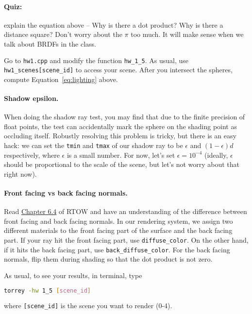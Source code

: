 \paragraph{Quiz:} explain the equation above -- Why is there a dot product? Why is there a distance square? Don't worry about the $\pi$ too much. It will make sense when we talk about BRDFs in the class.

Go to \lstinline{hw1.cpp} and modify the function \lstinline{hw_1_5}. As usual, use \lstinline{hw1_scenes[scene_id]} to access your scene. After you intersect the spheres, compute Equation~\eqref{eq:lighting} above.

\paragraph{Shadow epsilon.} When doing the shadow ray test, you may find that due to the finite precision of float points, the test can accidentally mark the sphere on the shading point as occluding itself. Robustly resolving this problem is tricky, but there is an easy hack: we can set the \lstinline{tmin} and \lstinline{tmax} of our shadow ray to be $\epsilon$ and $\left(1 - \epsilon\right) d$ respectively, where $\epsilon$ is a small number. For now, let's set $\epsilon = 10^{-4}$ (ideally, $\epsilon$ should be proportional to the scale of the scene, but let's not worry about that right now).

\paragraph{Front facing vs back facing normals.} Read \href{https://raytracing.github.io/books/RayTracingInOneWeekend.html#surfacenormalsandmultipleobjects/frontfacesversusbackfaces}{Chapter 6.4} of RTOW and have an understanding of the difference between front facing and back facing normals. In our rendering system, we assign two different materials to the front facing part of the surface and the back facing part. If your ray hit the front facing part, use \lstinline{diffuse_color}. On the other hand, if it hits the back facing part, use \lstinline{back_diffuse_color}. For the back facing normals, flip them during shading so that the dot product is not zero.

As usual, to see your results, in terminal, type
\begin{lstlisting}[language=bash]
  torrey -hw 1_5 [scene_id]
\end{lstlisting}
where \lstinline{[scene_id]} is the scene you want to render (0-4).

